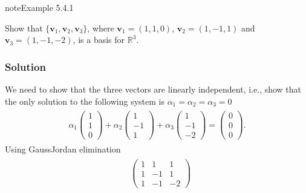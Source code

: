 \documentclass[letterpaper,10pt,english]{jupyterBook}
\begin{document}
\label{_pages/5.4_Basis:basis-example}
\begin{sphinxadmonition}{note}{Example 5.4.1}



\sphinxAtStartPar
Show that \(\{ \mathbf{v}_1, \mathbf{v}_2, \mathbf{v}_3\}\), where \(\mathbf{v}_1 = (1, 1, 0)\), \(\mathbf{v}_2 = (1, -1, 1)\) and \(\mathbf{v}_3 = (1, -1, -2)\), is a basis for \(\mathbb{R}^3\).
\subsubsection*{Solution}

\sphinxAtStartPar
We need to show that the three vectors are linearly independent, i.e., show that the only solution to the following system is \(\alpha_1 = \alpha_2 = \alpha_3 = 0\)
\begin{equation*}
\begin{split} \begin{align*}
    \alpha_1 \begin{pmatrix} 1 \\ 1 \\ 0 \end{pmatrix} +
    \alpha_2 \begin{pmatrix} 1 \\ -1 \\ 1 \end{pmatrix} +
    \alpha_3 \begin{pmatrix} 1 \\ -1 \\ -2 \end{pmatrix}  =
    \begin{pmatrix} 0 \\ 0 \\ 0 \end{pmatrix}.
\end{align*} \end{split}
\end{equation*}
\sphinxAtStartPar
Using Gauss\sphinxhyphen{}Jordan elimination
\begin{equation*}
\begin{split} \begin{align*}
    & \begin{pmatrix}
        1 & 1 & 1 \\
        1 & -1 & 1 \\
        1 & -1 & -2
    \end{pmatrix}
     \\ \\

\end{align*}
\end{split}
\end{equation*}
\end{sphinxadmonition}
\end{document}
